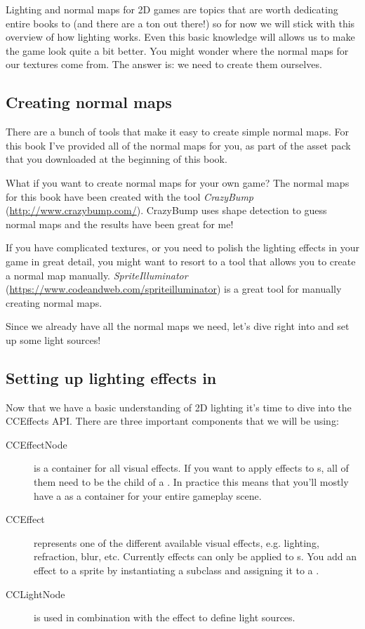 Lighting and normal maps for 2D games are topics that are worth dedicating
entire books to (and there are a ton out there!) so for now we will stick with
this overview of how lighting works. Even this basic knowledge will allows us to
make the game look quite a bit better. You might wonder where the normal maps
for our textures come from. The answer is: we need to create them ourselves. 

\subsection{Creating normal maps}
There are a bunch of tools that make it easy to create simple normal maps. For this book I've provided all of the normal maps for you, as
part of the asset pack that you downloaded at the beginning of this book.

What if you want to create normal maps for your own game? The normal maps for
this book have been created with the tool \textit{CrazyBump}
(\url{http://www.crazybump.com/}). CrazyBump uses shape detection to guess
normal maps and the results have been great for me!

If you have complicated textures, or you need to polish the lighting effects in
your game in great detail, you might want to resort to a tool that allows you to
create a normal map manually. \textit{SpriteIlluminator}
(\url{https://www.codeandweb.com/spriteilluminator}) is a great tool for
manually creating normal maps.

Since we already have all the normal maps we need, let's dive right into \SB{}
and set up some light sources!

\subsection{Setting up lighting effects in \SB{}}
Now that we have a basic understanding of 2D lighting it's time to dive into the
CCEffects API. There are three important components that we will be using:
\begin{description}
\item[CCEffectNode] is a container for all visual effects. If
you want to apply effects to \ccsprite{}s, all of them need to be the child of a
. In practice this means that you'll mostly have a
 as a container for your entire gameplay scene.
\item[CCEffect] represents one of the different available visual effects, e.g.
lighting, refraction, blur, etc. Currently effects can only be applied to
\ccsprite{}s. You add an effect to a sprite by instantiating a
 subclass and assigning it to a \ccsprite{}.
\item[CCLightNode] is used in combination with the effect
 to define light sources.
\end{description}

